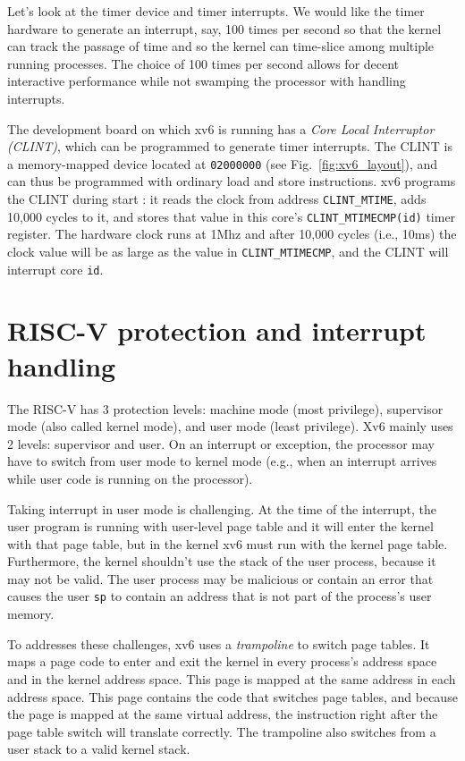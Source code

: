 Let's look at the timer device and timer interrupts.  We would like
the timer hardware to generate an interrupt, say, 100 times per
second so that the kernel can track the passage of time and so the
kernel can time-slice among multiple running processes.  The choice of
100 times per second allows for decent interactive performance while
not swamping the processor with handling interrupts.

The development board on which xv6 is running has a \textit{Core Local
  Interruptor (CLINT)}, which
can be programmed to generate timer interrupts.  The CLINT is a
memory-mapped device located at \lstinline{02000000} (see
Fig.~\ref{fig:xv6_layout}), and can thus be programmed with ordinary
load and store instructions.  xv6 programs the CLINT during start
: it reads the clock from address
\lstinline{CLINT_MTIME}, adds 10,000 cycles to it, and stores that
value in this core's \lstinline{CLINT_MTIMECMP(id)} timer register.
The hardware clock runs at 1Mhz and after 10,000 cycles (i.e., 10ms) the clock
value will be as large as the value in \lstinline{CLINT_MTIMECMP}, and
the CLINT will interrupt core \lstinline{id}.

\section{RISC-V protection and interrupt handling}

The RISC-V has 3 protection levels: machine mode (most privilege),
supervisor mode (also called kernel mode), and user mode (least
privilege).  Xv6 mainly uses 2 levels: supervisor and user. On an
interrupt or exception, the processor may have to switch from user
mode to kernel mode (e.g., when an interrupt arrives while user code
is running on the processor).

Taking interrupt in user mode is challenging.  At the time of the
interrupt, the user program is running with user-level page table and
it will enter the kernel with that page table, but in the kernel xv6
must run with the kernel page table. Furthermore, the kernel shouldn't
use the stack of the user process, because it may not be valid.  The
user process may be malicious or contain an error that causes the user
\texttt{sp} to contain an address that is not part of the process's
user memory.

To addresses these challenges, xv6 uses a
\textit{trampoline} to switch page tables.  It maps
a page code to enter and exit the kernel in every process's address
space and in the kernel address space.  This page is mapped at the
same address in each address space.  This page contains the code that
switches page tables, and because the page is mapped at the same
virtual address, the instruction right after the page table switch
will translate correctly.  The trampoline also switches from a user
stack to a valid kernel stack.

